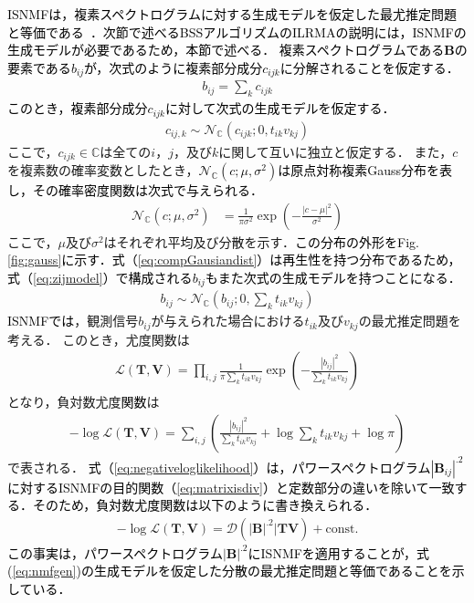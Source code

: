 \textcolor{black}{ISNMFは，複素スペクトログラムに対する生成モデルを仮定した最尤推定問題と等価である~\cite{isnmf}．次節で述べるBSSアルゴリズムのILRMAの説明には，ISNMFの生成モデルが必要であるため，本節で述べる．}
\textcolor{black}{複素スペクトログラムである$\bm{B}$の要素である$b_{ij}$が，次式のように複素部分成分$c_{ijk}$に分解されることを仮定する．}
\begin{align}
    b_{ij} = \sum_k c_{ijk}　\label{eq:zijmodel}
\end{align}
\textcolor{black}{このとき，複素部分成分$c_{ijk}$に対して次式の生成モデルを仮定する．}
\begin{align}
    c_{ij,k} \sim \mathcal{N}_{\mathbb{C}} (c_{ijk}; 0, t_{ik}v_{kj})
\end{align}
ここで，$c_{ijk}\in \mathbb{C}$は全ての$i$，$j$，及び$k$に関して互いに独立と仮定する．
また，$c$を複素数の確率変数としたとき，\textcolor{black}{$\mathcal{N}_{\mathbb{C}} (c; \mu, \sigma^2)$は原点対称複素Gauss分布を表し，その確率密度関数は次式で与えられる．}
\begin{align}
    \mathcal{N}_{\mathbb{C}} (c; \mu, \sigma^2) &= \frac{1}{\pi \sigma^2} \exp \left( -\frac{|c-\mu|^2}{\sigma^2} \right) \label{eq:compGausiandist}
\end{align}
ここで，$\mu$及び$\sigma^2$はそれぞれ平均及び分散を示す．\textcolor{black}{この分布の外形をFig. \ref{fig:gauss}に示す．式（\ref{eq:compGausiandist}）は再生性を持つ分布であるため，式（\ref{eq:zijmodel}）で構成される$b_{ij}$もまた次式の生成モデルを持つことになる．}
\begin{align}
    b_{ij} \sim \mathcal{N}_{\mathbb{C}}\left( b_{ij}; 0, \sum_k t_{ik} v_{kj} \right) \label{eq:nmfgen}
\end{align}
\textcolor{black}{ISNMFでは}，観測信号$b_{ij}$が与えられた場合における$t_{ik}$及び$v_{kj}$の最尤推定問題を考える．
このとき，尤度関数は
\begin{align}
    \mathcal{L}(\bm{T}, \bm{V}) = \prod_{i,j} \frac{1}{\pi \sum_k t_{ik} v_{kj} } \exp \left( -\frac{|b_{ij}|^2}{\sum_k t_{ik} v_{kj}} \right)
\end{align}
となり，負対数尤度\textcolor{black}{関数}は
\begin{align}
    -\log\mathcal{L}(\bm{T}, \bm{V}) = \sum_{i,j} \left( \frac{|b_{ij}|^2}{\sum_k t_{ik} v_{kj}} + \log \sum_k t_{ik} v_{kj} + \log \pi \right) \label{eq:negativeloglikelihood}
\end{align}
で表される．
\textcolor{black}{式（\ref{eq:negativeloglikelihood}）は，パワースペクトログラム$|\bm{B}_{ij}|^{.2}$に対するISNMFの目的関数（\ref{eq:matrixisdiv}）と定数部分の違いを除いて一致する．そのため，負対数尤度関数は以下のように書き換えられる．}
\begin{align}
    -\log\mathcal{L}(\bm{T}, \bm{V}) = \mathcal{D} \left( |\bm{B}|^{.2} | \bm{TV} \right) + \mathrm{const.}
    \label{eq:isnmf}
\end{align}
\textcolor{black}{この事実は，パワースペクトログラム$|\bm{B}|^{.2}$にISNMFを適用することが，式(\ref{eq:nmfgen})の生成モデルを仮定した分散の最尤推定問題と等価であることを示している\cite{GGD}．}

